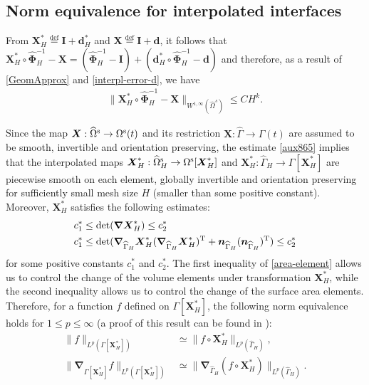 \documentclass[11pt,reqno]{amsart}
\theoremstyle{definition}
\theoremstyle{plain}
\numberwithin{theorem}{section}
\numberwithin{proposition}{section}
\numberwithin{lemma}{section}
\numberwithin{equation}{section}
\newcommand{\bs}[1]{\boldsymbol{#1}}
\newcommand{\uu}[1]  {{\bs{#1}} }
\newcommand{\grad}   { \uu{\nabla}    }
\renewcommand{\(}{\bigl(}
\renewcommand{\)}{\bigr)}
\def\eqd{\stackrel{\mathrm{def}}{=}}
\begin{document}
\subsection{Norm equivalence for interpolated interfaces}

From ${\bs X}_H^* \eqd {\bs I}+{\bs d}_H^*$ and ${\bs X} \eqd {\bs I}+{\bs d}$, it follows that ${\bs X}_H^*\circ\widehat{\bs\Phi}_H^{-1} - {\bs X} = (\widehat{\bs\Phi}_H^{-1}-{\bs I}) + ({\bs d}_H^*\circ\widehat{\bs\Phi}_H^{-1} - {\bs d})$ and therefore, as a result of \eqref{GeomApprox} and \eqref{interpl-error-d}, we have 
\begin{align}\label{aux865}
\|{\bs X}_H^*\circ\widehat{\bs\Phi}_H^{-1} - {\bs X} \|_{W^{1,\infty}(\widehat{\Omega}^s)} \le C H^k. 
\end{align}

Since the  map ${\bs X}:\widehat{\Omega}^{\rm s}\rightarrow\Omega^{\rm s}(t)$ and its restriction ${\bs X}:\widehat\Gamma\rightarrow\Gamma(t)$ are assumed to be smooth, invertible and orientation preserving, the estimate \eqref{aux865} implies that  the interpolated maps ${\bs X}_H^*:\widehat{\Omega}^{\rm s}_H\rightarrow\Omega^{\rm s}[{\bs X}_H^*]$ and ${\bs X}_H^*:\widehat\Gamma_H \rightarrow\Gamma[{\bs X}_H^*]$ are piecewise smooth on each element, globally invertible and orientation preserving for sufficiently small mesh size $H$ (smaller than some positive constant). Moreover, ${\bs X}_H^*$ satisfies the following estimates: 
\begin{subequations}\label{area-element}
\begin{align}
&c_1^* \le \det(\grad {\bs X}_H^*) \le c_2^*  \\
&c_1^* \le \det(\grad_{\widehat\Gamma_H} {\bs X}_H^* (\grad_{\widehat\Gamma_H} {\bs X}_H^*)^{\rm T}+{\bs n}_{\widehat\Gamma_H}({\bs n}_{\widehat\Gamma_H})^{\rm T}) 
\le c_2^* 
\end{align}
\end{subequations}
for some positive constants $c_1^*$ and $c_2^*$. The first inequality of \eqref{area-element} allows us to control the change of the volume elements under transformation ${\bs X}_H^*$, while the second inequality allows us to control the change of the surface area elements. 
Therefore, for a function $f$ defined on $\Gamma[{\bs X}_H^*]$,  the following norm equivalence holds for $1\le p\le \infty$ (a proof of this result can be found in \cite[Lemma 3.2]{Gao-Li-Tang-2025}): 
\begin{subequations}\label{norm-equiv-interpl-1}
\begin{align}
\|f\|_{L^p(\Gamma[{\bs X}_H^*])} &\simeq \|f\circ {\bs X}_H^*\|_{L^p(\widehat\Gamma_H )} , \\
\|\grad_{\Gamma[{\bs X}_H^*]} f\|_{L^p(\Gamma[{\bs X}_H^*])} &\simeq \|\grad_{\widehat\Gamma_H} (f\circ {\bs X}_H^*)\|_{L^p(\widehat\Gamma_H )} .
\end{align}
\end{subequations}
\end{document}
